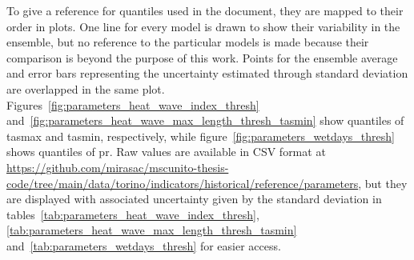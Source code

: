 To give a reference for quantiles used in the document, they are mapped to their order in plots. One line for every model is drawn to show their variability in the ensemble, but no reference to the particular models is made because their comparison is beyond the purpose of this work. Points for the ensemble average and error bars representing the uncertainty estimated through standard deviation are overlapped in the same plot. Figures~\ref{fig:parameters_heat_wave_index_thresh} and~\ref{fig:parameters_heat_wave_max_length_thresh_tasmin} show quantiles of \gls{tasmax} and \gls{tasmin}, respectively, while figure~\ref{fig:parameters_wetdays_thresh} shows quantiles of \gls{pr}. Raw values are available in CSV format at \url{https://github.com/mirasac/mscunito-thesis-code/tree/main/data/torino/indicators/historical/reference/parameters}, but they are displayed with associated uncertainty given by the standard deviation in tables~\ref{tab:parameters_heat_wave_index_thresh}, \ref{tab:parameters_heat_wave_max_length_thresh_tasmin} and~\ref{tab:parameters_wetdays_thresh} for easier access.

